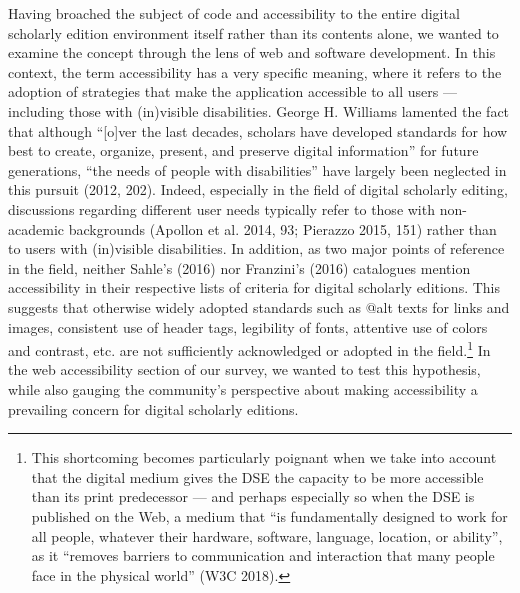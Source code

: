 \begin{paper}
Having broached the subject of code and accessibility to the entire
digital scholarly edition environment itself rather than its contents
alone, we wanted to examine the concept through the lens of web and
software development. In this context, the term accessibility has a very
specific meaning, where it refers to the adoption of strategies that
make the application accessible to all users --- including those with
(in)visible disabilities. George H. Williams lamented the fact that
although ``{[}o{]}ver the last decades, scholars have developed
standards for how best to create, organize, present, and preserve
digital information'' for future generations, ``the needs of people with
disabilities'' have largely been neglected in this pursuit (2012, 202).
Indeed, especially in the field of digital scholarly editing,
discussions regarding different user needs typically refer to those with
non-academic backgrounds (Apollon et al. 2014, 93; Pierazzo 2015, 151)
rather than to users with (in)visible disabilities. In addition, as two
major points of reference in the field, neither Sahle's (2016) nor
Franzini's (2016) catalogues mention accessibility in their respective
lists of criteria for digital scholarly editions. This suggests that
otherwise widely adopted standards such as @alt texts for links and
images, consistent use of header tags, legibility of fonts, attentive
use of colors and contrast, etc. are not sufficiently acknowledged or
adopted in the field.\footnote{This shortcoming becomes particularly
  poignant when we take into account that the digital medium gives the
  DSE the capacity to be more accessible than its print predecessor ---
  and perhaps especially so when the DSE is published on the Web, a
  medium that ``is fundamentally designed to work for all people,
  whatever their hardware, software, language, location, or ability'',
  as it ``removes barriers to communication and interaction that many
  people face in the physical world'' (W3C 2018).} In the web
accessibility section of our survey, we wanted to test this hypothesis,
while also gauging the community's perspective about making
accessibility a prevailing concern for digital scholarly editions.


\end{paper}
